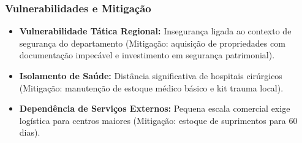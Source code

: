 \subsubsection{Vulnerabilidades e
Mitigação}

\begin{itemize}
\tightlist
\item
  \textbf{Vulnerabilidade Tática Regional:} Insegurança ligada ao
  contexto de segurança do departamento (Mitigação: aquisição de
  propriedades com documentação impecável e investimento em segurança
  patrimonial).
\item
  \textbf{Isolamento de Saúde:} Distância significativa de hospitais
  cirúrgicos (Mitigação: manutenção de estoque médico básico e kit
  trauma local).
\item
  \textbf{Dependência de Serviços Externos:} Pequena escala comercial
  exige logística para centros maiores (Mitigação: estoque de
  suprimentos para 60 dias).
\end{itemize}

